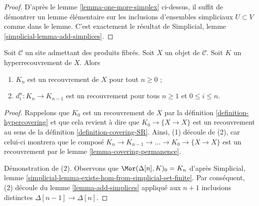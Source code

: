 \begin{proof}
D'après le lemme \ref{lemma-one-more-simplex}
ci-dessus, il suffit de démontrer un lemme élémentaire
sur les inclusions d'ensembles simpliciaux $U \subset V$ comme dans le
lemme. C'est exactement le résultat de
Simplicial, lemme \ref{simplicial-lemma-add-simplices}.
\end{proof}

\begin{lemma}
\label{lemma-degeneracy-maps-coverings}
Soit $\mathcal{C}$ un site admettant des produits fibrés. Soit $X$ un objet de
$\mathcal{C}$. Soit $K$ un hyperrecouvrement de $X$. Alors
\begin{enumerate}
\item $K_n$ est un recouvrement de $X$ pour tout $n \geq 0$ ;
\item $d^n_i : K_n \to K_{n - 1}$ est un recouvrement pour tous $n \geq 1$
et $0 \leq i \leq n$.
\end{enumerate}
\end{lemma}

\begin{proof}
Rappelons que $K_0$ est un recouvrement de $X$ par la
définition \ref{definition-hypercovering}
et que cela revient à dire que
$K_0 \to \{X \to X\}$ est un recouvrement au sens
de la définition \ref{definition-covering-SR}.
Ainsi, (1) découle de (2), car celui-ci montrera que le
composé
$K_n \to K_{n - 1} \to \ldots \to K_0 \to \{X \to X\}$
est un recouvrement par le lemme \ref{lemma-covering-permanence}.

\medskip\noindent
Démonstration de (2). Observons que
$\Mor(\Delta[n], K)_0 = K_n$ d'après
Simplicial, lemme \ref{simplicial-lemma-exists-hom-from-simplicial-set-finite}.
Par conséquent, (2) découle du lemme \ref{lemma-add-simplices}
appliqué aux $n + 1$ inclusions distinctes $\Delta[n - 1] \to \Delta[n]$.
\end{proof}

